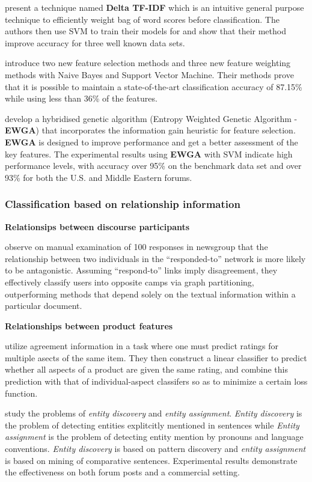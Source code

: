 \documentclass{article}
\begin{document}
\begin{multicols}{2}
        \citet{Martineau2009a} present a technique named \textbf{Delta TF-IDF}
which is an intuitive general purpose technique to efficiently weight bag of word 
scores before classification. The authors then use SVM to train their models 
for and show that their method improve accuracy for three well known data sets.

        \citet{Keefe2006} introduce two new feature selection methods and three
new feature weighting methods with Naive Bayes and Support Vector Machine.
Their methods prove that it is possible to maintain a state-of-the-art
classification accuracy of 87.15\% while using less than 36\% of the features.

        \citet{Abbasi2007} develop a hybridised genetic algorithm (Entropy
Weighted Genetic Algorithm - \textbf{EWGA}) that incorporates the information 
gain heuristic for feature selection. \textbf{EWGA} is designed to improve
performance and get a better assessment of the key features. The experimental
results using \textbf{EWGA} with SVM indicate high performance levels, with
accuracy over 95\% on the benchmark data set and over 93\% for both the U.S.
and Middle Eastern forums.


    \subsubsection{Classification based  on relationship information}
      \textbf{Relationsips between discourse participants}
            
        \citet{Agrawal2003} observe on manual examination of 100
responses in newsgroup that the relationship between two individuals in the
``responded-to'' network is more likely to be antagonistic. Assuming
``respond-to'' links imply disagreement, they effectively classify users into
opposite camps via graph partitioning, outperforming methods that depend solely
on the textual information within a particular document.

      \textbf{Relationships between product features}
          
        \citet{Snyder2007} utilize agreement information in a task where
one must predict ratings for multiple asects of the same item. They then
construct a linear classifier to predict whether all aspects of a product are
given the same rating, and combine this prediction with that of
individual-aspect classifers so as to minimize a certain loss function.
\cite{Snyder2007}

        \citet{Ding2009} study the problems of \textit{entity discovery} and
\textit{entity assignment}. \textit{Entity discovery} is the problem of
detecting entities explitcitly mentioned in sentences while \textit{Entity
assignment} is the problem of detecting entity mention by pronouns and language
conventions. \textit{Entity discovery} is based on pattern discovery and
\textit{entity assignment} is based on mining of comparative sentences. 
Experimental results demonstrate the effectiveness on both forum posts and 
a commercial setting.
        

\end{multicols}
\end{document}
